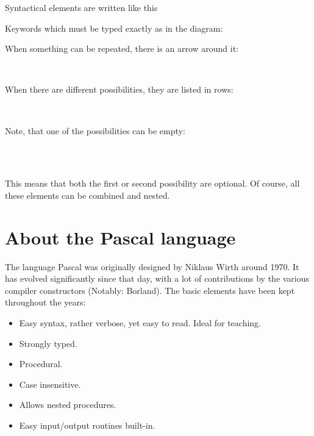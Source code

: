 Syntactical elements are written like this
\begin{mysyntdiag}
\end{mysyntdiag}
Keywords which must be typed exactly as in the diagram:
\begin{mysyntdiag}
\end{mysyntdiag}
When something can be repeated, there is an arrow around it:
\begin{mysyntdiag}
\begin{rep}[b]  \\ \end{rep}
\end{mysyntdiag}
When there are different possibilities, they are listed in rows:
\begin{mysyntdiag}
\begin{stack}
 \\
\end{stack}
\end{mysyntdiag}
Note, that one of the possibilities can be empty:
\begin{mysyntdiag}
\begin{stack}\\
 \\
\end{stack}
\end{mysyntdiag}
This means that both the first or second possibility are optional.
Of course, all these elements can be combined and nested.

\section*{About the Pascal language}
The language Pascal was originally designed by Niklaus Wirth around 1970.
It has evolved significantly since that day, with a lot of contributions
by the various compiler constructors (Notably: Borland). The basic elements
have been kept throughout the years:
\begin{itemize}
\item Easy syntax, rather verbose, yet easy to read. Ideal for teaching.
\item Strongly typed.
\item Procedural.
\item Case insensitive.
\item Allows nested procedures.
\item Easy input/output routines built-in.
\end{itemize}

